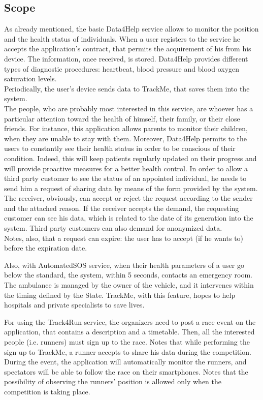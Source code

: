 \subsection{Scope}
As already mentioned, the basic Data4Help service allows to monitor the position and the health status of individuals. When a user registers to the service he accepts the application's contract, that permits the acquirement of his from his device. The information, once received, is stored. Data4Help provides different types of diagnostic procedures:  heartbeat, blood pressure and blood oxygen saturation levels.\\ 
Periodically, the user's device sends data to TrackMe, that saves them into the system. \\ 
The people, who are probably most interested in this service, are whoever has a particular attention toward the health of himself, their family, or their close friends.
For instance, this application allows parents to monitor their children, when they are unable to stay with them. 
Moreover, Data4Help permits to the users to constantly see their health status in order to be conscious of their condition. Indeed, this will keep patients regularly updated on their progress and will provide proactive measures for a better health control. 
In order to allow a third party customer to see the status of an appointed individual, he needs to send him a request of sharing data by means of the form provided by the system. 
The receiver, obviously, can accept or reject the request according to the sender and the attached reason. 
If the receiver accepts the demand, the requesting customer can see his data, which is related to the date of its generation into the system. Third party customers can also demand for anonymized data. \\ 
Notes, also, that a request can expire: the user has to accept (if he wants to) before the expiration date.

\par
Also, with AutomatedSOS service, when their health parameters of a user go below the standard, the system, within 5 seconds, contacts an emergency room.
The ambulance is managed by the owner of the vehicle, and it intervenes within the timing defined by the State.
TrackMe, with this feature, hopes to help hospitals and private specialists to save lives.

\par
For using the Track4Run service, the organizers need to post a race event on the application, that contains a description and a timetable. 
Then, all the interested people (i.e. runners) must sign up to the race.
Notes that while performing the sign up to TrackMe, a runner accepts to share his data during the competition. 
During the event, the application will automatically monitor the runners, and spectators will be able to follow the race on their smartphones. 
Notes that the possibility of observing the runners' position is allowed only when the competition is taking place. \\

